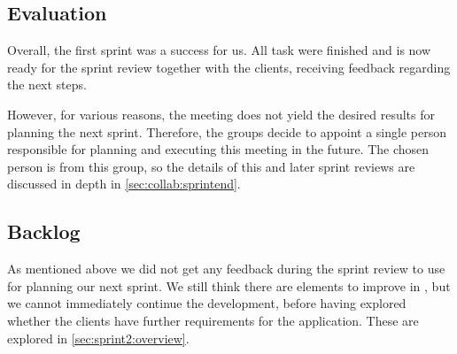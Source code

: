 \subsection{Evaluation}
Overall, the first sprint was a success for us.
All task were finished and \launcher is now ready for the sprint review together with the clients, receiving feedback regarding the next steps.

However, for various reasons, the meeting does not yield the desired results for planning the next sprint.
Therefore, the groups decide to appoint a single person responsible for planning and executing this meeting in the future.
The chosen person is from this group, so the details of this and later sprint reviews are discussed in depth in \cref{sec:collab:sprintend}.

\subsection{Backlog}
As mentioned above we did not get any feedback during the sprint review to use for planning our next sprint.
We still think there are elements to improve in \launcher, but we cannot immediately continue the development, before having explored whether the clients have further requirements for the application.
These are explored in \cref{sec:sprint2:overview}.
